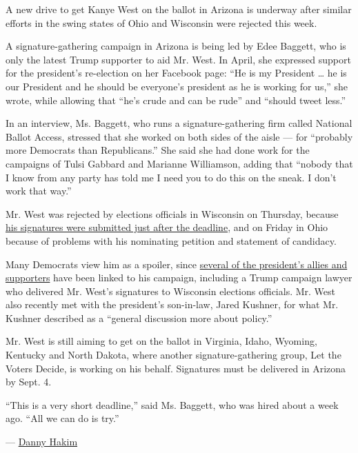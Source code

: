 A new drive to get Kanye West on the ballot in Arizona is underway after
similar efforts in the swing states of Ohio and Wisconsin were rejected
this week.

A signature-gathering campaign in Arizona is being led by Edee Baggett,
who is only the latest Trump supporter to aid Mr. West. In April, she
expressed support for the president's re-election on her Facebook page:
``He is my President \ldots{} he is our President and he should be
everyone's president as he is working for us,'' she wrote, while
allowing that ``he's crude and can be rude'' and ``should tweet less.''

In an interview, Ms. Baggett, who runs a signature-gathering firm called
National Ballot Access, stressed that she worked on both sides of the
aisle --- for ``probably more Democrats than Republicans.'' She said she
had done work for the campaigns of Tulsi Gabbard and Marianne
Williamson, adding that ``nobody that I know from any party has told me
I need you to do this on the sneak. I don't work that way.''

Mr. West was rejected by elections officials in Wisconsin on Thursday,
because
\href{https://www.nytimes3xbfgragh.onion/2020/08/19/us/elections/kanye-west-should-be-kept-off-wisconsins-ballot-election-agency-staff-members-say.html}{his
signatures were submitted just after the deadline}, and on Friday in
Ohio because of problems with his nominating petition and statement of
candidacy.

Many Democrats view him as a spoiler, since
\href{https://www.nytimes3xbfgragh.onion/2020/08/04/us/politics/kanye-west-president-republicans.html}{several
of the president's allies and supporters} have been linked to his
campaign, including a Trump campaign lawyer who delivered Mr. West's
signatures to Wisconsin elections officials. Mr. West also recently met
with the president's son-in-law, Jared Kushner, for what Mr. Kushner
described as a ``general discussion more about policy.''

Mr. West is still aiming to get on the ballot in Virginia, Idaho,
Wyoming, Kentucky and North Dakota, where another signature-gathering
group, Let the Voters Decide, is working on his behalf. Signatures must
be delivered in Arizona by Sept. 4.

``This is a very short deadline,'' said Ms. Baggett, who was hired about
a week ago. ``All we can do is try.''

--- \href{https://www.nytimes3xbfgragh.onion/by/danny-hakim}{Danny
Hakim}

